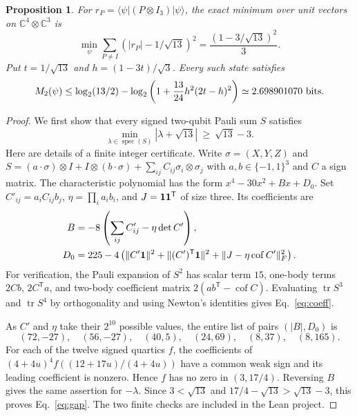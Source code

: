 \documentclass[11pt]{article}
\newtheorem{proposition}[theorem]{Proposition}
\newcommand{\CC}{\mathbb C}\newcommand{\ZZ}{\mathbb Z}\newcommand{\RR}{\mathbb R}
\newcommand{\tr}{\operatorname{tr}}\newcommand{\rank}{\operatorname{rank}}
\newcommand{\cof}{\operatorname{cof}}\newcommand{\spec}{\operatorname{spec}}
\begin{document}
\begin{proposition}\label{prop:gap}
For $r_P=\langle\psi|(P\otimes I_3)|\psi\rangle$, the exact minimum over unit vectors on $\CC^4\otimes\CC^3$ is
\begin{equation}
 \min_{\psi}\sum_{P\ne I}\left(|r_P|-1/\sqrt{13}\right)^2
             =\frac{(1-3/\sqrt{13})^2}{3}. \label{eq:min}
\end{equation}
Put $t=1/\sqrt{13}$ and $h=(1-3t)/\sqrt3$. Every such state satisfies
\[
 M_2(\psi)\leq
 \log_2(13/2)-\log_2\left(1+\frac{13}{24}h^2(2t-h)^2\right)
 \simeq 2.698901070\ {\rm bits}.
\]
\end{proposition}
\begin{proof}
We first show that every signed two-qubit Pauli sum $S$ satisfies
\begin{equation}
    \min_{\lambda\in\spec(S)}|\lambda+\sqrt{13}|\ \geq\ \sqrt{13}-3. \label{eq:gap}
\end{equation}
Here are details of a finite integer certificate. Write $\sigma=(X,Y,Z)$ and
$S=(a\cdot\sigma)\otimes I+I\otimes(b\cdot\sigma)+\sum_{ij}C_{ij}\sigma_i\otimes\sigma_j$
with $a,b\in\{-1,1\}^3$ and $C$ a sign matrix. The characteristic polynomial has the form $x^4-30x^2+B x+D_0$. Set $C'_{ij}=a_iC_{ij}b_j$, $\eta=\prod_i a_i b_i$, and $J=\mathbf 1\mathbf 1^{\mathsf T}$ of size three. Its coefficients are
\begin{align}
 B&=-8\left(\sum_{ij}C'_{ij}-\eta\det C'\right), \notag\\
 D_0&=225-4\left(\|C'\one\|^2+\|(C')^{\mathsf T}\one\|^2+
                              \|J-\eta\cof C'\|_F^2\right).              \label{eq:coeff}
\end{align}
For verification, the Pauli expansion of $S^2$ has scalar term $15$, one-body terms $2Cb$, $2C^{\mathsf T}a$, and two-body coefficient matrix $2(ab^{\mathsf T}-\cof C)$. Evaluating $\tr S^3$ and $\tr S^4$ by orthogonality and using Newton's identities gives Eq.~\eqref{eq:coeff}.

As $C'$ and $\eta$ take their $2^{10}$ possible values, the entire list of pairs $(|B|,D_0)$ is
\[
 (72,-27),\quad(56,-27),\quad(40,5),\quad(24,69),\quad(8,37),\quad(8,165).
\]
For each of the twelve signed quartics $f$, the coefficients of
$(4+4u)^4 f((12+17u)/(4+4u))$ have a common weak sign and its leading coefficient is nonzero. Hence $f$ has no zero in $(3,17/4)$. Reversing $B$ gives the same assertion for $-\lambda$. Since $3<\sqrt{13}$ and $17/4-\sqrt{13}>\sqrt{13}-3$, this proves Eq.~\eqref{eq:gap}. The two finite checks are included in the Lean project.


\end{proof}
\end{document}
